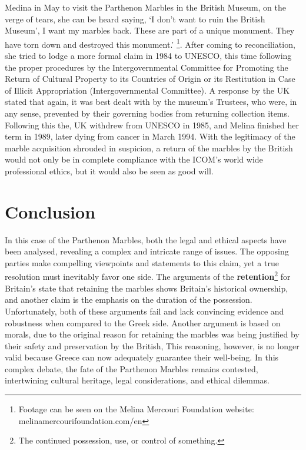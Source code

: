 \documentclass[12pt, letterpaper]{article}
\begin{document}
Medina in May to visit the Parthenon Marbles in the British Museum, on the verge of tears, she can be heard saying, ‘I don’t want to ruin the British Museum’, I want my marbles back. These are part of a unique monument. They have torn down and destroyed this monument.' \footnote{Footage can be seen on the Melina Mercouri Foundation website: melinamercourifoundation.com/en}. After coming to reconciliation, she tried to lodge a more formal claim in 1984 to UNESCO, this time following the proper procedures by the Intergovernmental Committee for Promoting the Return of Cultural Property to its Countries of Origin or its Restitution in Case of Illicit Appropriation (Intergovernmental Committee). A response by the UK stated that again, it was best dealt with by the museum’s Trustees, who were, in any sense, prevented by their governing bodies from returning collection items. Following this the, UK withdrew from UNESCO in 1985, and Melina finished her term in 1989, later dying from cancer in March 1994. With the legitimacy of the marble acquisition shrouded in suspicion, a return of the marbles by the British would not only be in complete compliance with the ICOM's world wide professional ethics, but it would also be seen as good will. 

\section*{Conclusion}
In this case of the Parthenon Marbles, both the legal and ethical aspects have been analysed, revealing a complex and intricate range of issues. The opposing parties make compelling viewpoints and statements to this claim, yet a true resolution must inevitably favor one side. The arguments of the \textbf{retention}\footnote{The continued possession, use, or control of something.} for Britain's state that retaining the marbles shows Britain's historical ownership, and another claim is the emphasis on the duration of the possession. Unfortunately, both of these arguments fail and lack convincing evidence and robustness when compared to the Greek side. Another argument is based on morals, due to the original reason for retaining the marbles was being justified by their safety and preservation by the British, This reasoning, however, is no longer valid because Greece can now adequately guarantee their well-being. In this complex debate, the fate of the Parthenon Marbles remains contested, intertwining cultural heritage, legal considerations, and ethical dilemmas.
\end{document}
